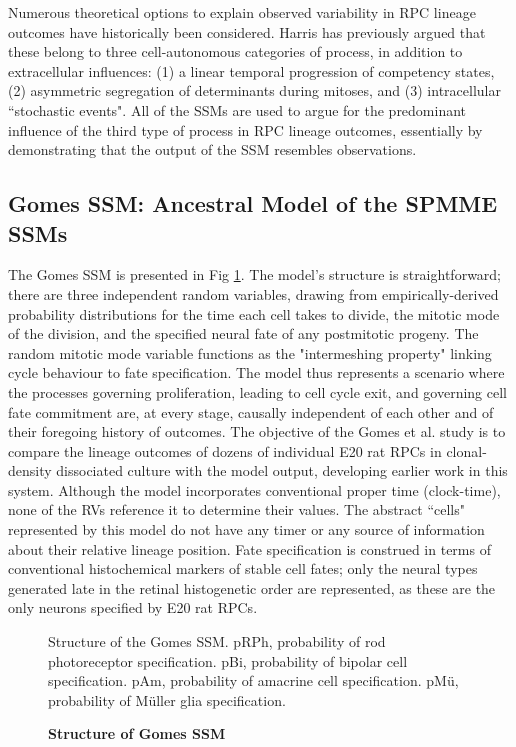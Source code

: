 \documentclass[10pt,letterpaper]{article}
\begin{document}
Numerous theoretical options to explain observed variability in RPC lineage outcomes have historically been considered. Harris has previously argued that these belong to three cell-autonomous categories of process, in addition to extracellular influences: (1) a linear temporal progression of competency states, (2) asymmetric segregation of determinants during mitoses, and (3) intracellular ``stochastic events"\cite{Holt1988,Agathocleous2009}. All of the SSMs are used to argue for the predominant influence of the third type of process in RPC lineage outcomes, essentially by demonstrating that the output of the SSM resembles observations.
 
 \subsection*{Gomes SSM: Ancestral Model of the SPMME SSMs}
 
The Gomes SSM is presented in Fig \ref{GomesSSM}. The model's structure is straightforward; there are three independent random variables, drawing from empirically-derived probability distributions for the time each cell takes to divide, the mitotic mode of the division, and the specified neural fate of any postmitotic progeny. The random mitotic mode variable functions as the "intermeshing property" linking cycle behaviour to fate specification. The model thus represents a scenario where the processes governing proliferation, leading to cell cycle exit, and governing cell fate commitment are, at every stage, causally independent of each other and of their foregoing history of outcomes. The objective of the Gomes et al. study is to compare the lineage outcomes of dozens of individual E20 rat RPCs in clonal-density dissociated culture with the model output, developing earlier work in this system\cite{Cayouette2003}. Although the model incorporates conventional proper time (clock-time), none of the RVs reference it to determine their values. The abstract ``cells" represented by this model do not have any timer or any source of information about their relative lineage position.  Fate specification is construed in terms of conventional histochemical markers of stable cell fates; only the neural types generated late in the retinal histogenetic order are represented, as these are the only neurons specified by E20 rat RPCs.
 
\begin{figure}[!h]
\caption{{\bf Structure of Gomes SSM}}
Structure of the Gomes SSM. pRPh, probability of rod photoreceptor specification. pBi, probability of bipolar cell specification. pAm, probability of amacrine cell specification. pM{\"u}, probability of M{\"u}ller glia specification.
\label{GomesSSM}
\end{figure}
 
\end{document}
